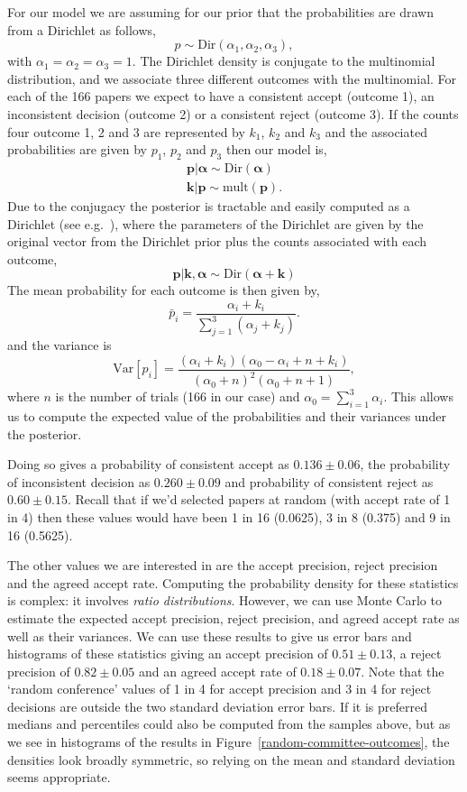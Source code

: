 For our model we are assuming for our prior that the probabilities are
drawn from a Dirichlet as follows, 
\[
p \sim \text{Dir}(\alpha_1, \alpha_2, \alpha_3),
\] 
with \(\alpha_1=\alpha_2=\alpha_3=1\). The Dirichlet density is
conjugate to the
multinomial
distribution, and we associate three different outcomes with the
multinomial. For each of the 166 papers we expect to have a consistent
accept (outcome 1), an inconsistent decision (outcome 2) or a consistent
reject (outcome 3). If the counts four outcome 1, 2 and 3 are
represented by \(k_1\), \(k_2\) and \(k_3\) and the associated
probabilities are given by \(p_1\), \(p_2\) and \(p_3\) then our model
is, \begin{align*}
\mathbf{p}|\boldsymbol{\alpha} \sim \text{Dir}(\boldsymbol{\alpha}) \\
\mathbf{k}|\mathbf{p} \sim \text{mult}(\mathbf{p}).
\end{align*} Due to the conjugacy the posterior is tractable and easily
computed as a Dirichlet (see
e.g.~\cite{Gelman-bayesian13}),
where the parameters of the Dirichlet are given by the original vector
from the Dirichlet prior plus the counts associated with each outcome,
\[
\mathbf{p}|\mathbf{k}, \boldsymbol{\alpha} \sim \text{Dir}(\boldsymbol{\alpha} + \mathbf{k})
\] The mean probability for each outcome is then given by, \[
\bar{p}_i = \frac{\alpha_i+k_i}{\sum_{j=1}^3(\alpha_j + k_j)}.
\] and the variance is \[
\mathrm{Var}[p_i] = \frac{(\alpha_i+k_i) (\alpha_0-\alpha_i + n + k_i)}{(\alpha_0+n)^2 (\alpha_0+n+1)},
\] where \(n\) is the number of trials (166 in our case) and
\(\alpha_0 = \sum_{i=1}^3\alpha_i\). This allows us to compute the
expected value of the probabilities and their variances under the
posterior.

Doing so gives a probability of consistent accept as \(0.136 \pm 0.06\), the
probability of inconsistent decision as \(0.260 \pm 0.09\) and
probability of consistent reject as \(0.60 \pm 0.15\). Recall that if
we'd selected papers at random (with accept rate of 1 in 4) then these
values would have been 1 in 16 (0.0625), 3 in 8 (0.375) and 9 in 16
(0.5625).

The other values we are interested in are the accept precision, reject
precision and the agreed accept rate. Computing the probability density
for these statistics is complex: it involves \emph{ratio
distributions}. However, we can use Monte Carlo to estimate the expected
accept precision, reject precision, and agreed accept rate as well as
their variances. We can use these results to give us error bars and
histograms of these statistics giving an accept precision of \(0.51 \pm 0.13\), a reject precision of
\(0.82 \pm 0.05\) and an agreed accept rate of \(0.18 \pm 0.07\). Note
that the `random conference' values of 1 in 4 for accept precision and 3
in 4 for reject decisions are outside the two standard deviation error
bars. If it is preferred medians and percentiles could also be computed
from the samples above, but as we see in histograms  of the results in Figure~\ref{random-committee-outcomes},
the densities look broadly symmetric, so relying on the mean and standard deviation seems appropriate.

